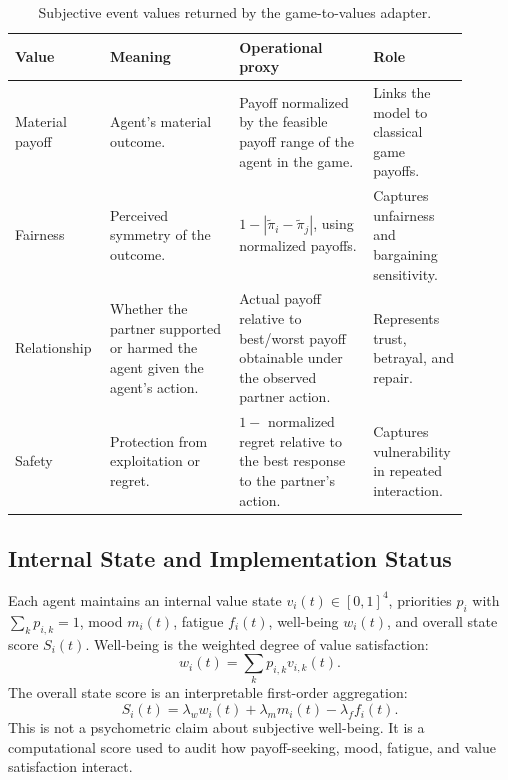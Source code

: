 \documentclass[runningheads]{llncs}
\begin{document}
\begin{table}[t]
\centering
\caption{Subjective event values returned by the game-to-values adapter.}
\label{tab:values}
\scriptsize
\begin{tabular}{p{0.18\linewidth}p{0.27\linewidth}p{0.29\linewidth}p{0.16\linewidth}}
\toprule
Value & Meaning & Operational proxy & Role \\
\midrule
Material payoff & Agent's material outcome. & Payoff normalized by the feasible payoff range of the agent in the game. & Links the model to classical game payoffs. \\
Fairness & Perceived symmetry of the outcome. & $1-|\tilde{\pi}_i-\tilde{\pi}_j|$, using normalized payoffs. & Captures unfairness and bargaining sensitivity. \\
Relationship & Whether the partner supported or harmed the agent given the agent's action. & Actual payoff relative to best/worst payoff obtainable under the observed partner action. & Represents trust, betrayal, and repair. \\
Safety & Protection from exploitation or regret. & $1-$ normalized regret relative to the best response to the partner's action. & Captures vulnerability in repeated interaction. \\
\bottomrule
\end{tabular}
\end{table}

\subsection{Internal State and Implementation Status}

Each agent maintains an internal value state $v_i(t)\in[0,1]^4$, priorities $p_i$ with $\sum_k p_{i,k}=1$, mood $m_i(t)$, fatigue $f_i(t)$, well-being $w_i(t)$, and overall state score $S_i(t)$. Well-being is the weighted degree of value satisfaction:
\[
w_i(t)=\sum_k p_{i,k}v_{i,k}(t).
\]
The overall state score is an interpretable first-order aggregation:
\[
S_i(t)=\lambda_w w_i(t)+\lambda_m m_i(t)-\lambda_f f_i(t).
\]
This is not a psychometric claim about subjective well-being. It is a computational score used to audit how payoff-seeking, mood, fatigue, and value satisfaction interact.

\begin{table}[t]
\centering
\caption{Status of major mechanisms in the current article.}
\label{tab:implstatus}
\scriptsize

\end{table}
\end{document}
